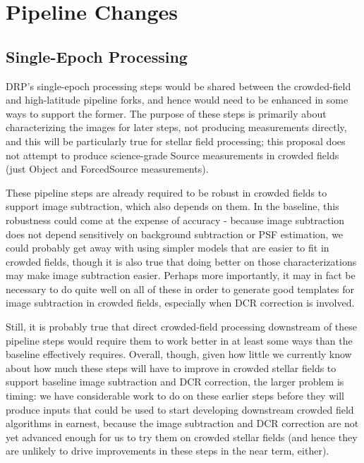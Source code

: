 \documentclass[DM,authoryear,toc]{lsstdoc}
\begin{document}
\section{Pipeline Changes}

\subsection{Single-Epoch Processing}
\label{sec:single-epoch-processing}

DRP's single-epoch processing steps would be shared between the crowded-field and high-latitude pipeline forks, and hence would need to be enhanced in some ways to support the former.
The purpose of these steps is primarily about characterizing the images for later steps, not producing measurements directly, and this will be particularly true for stellar field processing; this proposal does not attempt to produce science-grade Source measurements in crowded fields (just Object and ForcedSource measurements).

These pipeline steps are already required to be robust in crowded fields to support image subtraction, which also depends on them.
In the baseline, this robustness could come at the expense of accuracy - because image subtraction does not depend sensitively on background subtraction or PSF estimation, we could probably get away with using simpler models that are easier to fit in crowded fields, though it is also true that doing better on those characterizations may make image subtraction easier.
Perhaps more importantly, it may in fact be necessary to do quite well on all of these in order to generate good templates for image subtraction in crowded fields, especially when DCR correction is involved.

Still, it is probably true that direct crowded-field processing downstream of these pipeline steps would require them to work better in at least some ways than the baseline effectively requires.
Overall, though, given how little we currently know about how much these steps will have to improve in crowded stellar fields to support baseline image subtraction and DCR correction, the larger problem is timing: we have considerable work to do on these earlier steps before they will produce inputs that could be used to start developing downstream crowded field algorithms in earnest, because the image subtraction and DCR correction are not yet advanced enough for us to try them on crowded stellar fields (and hence they are unlikely to drive improvements in these steps in the near term, either).
\end{document}
